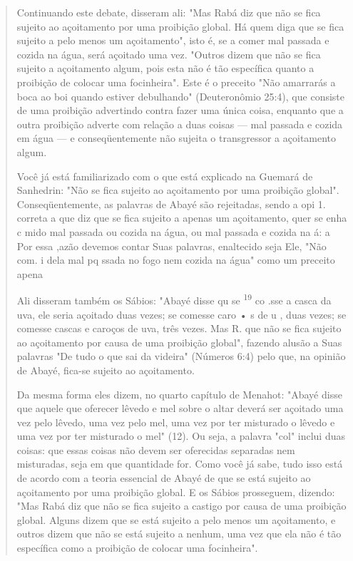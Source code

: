 \begin{quote}
Continuando este debate, disseram ali: "Mas Rabá diz que não se fi­ca
sujeito ao açoitamento por uma proibição global. Há quem diga que se
fica sujeito a pelo menos um açoitamento", isto é, se a comer mal
passada e cozida na água, será açoitado uma vez. "Outros dizem que não
se fica sujeito a açoita­mento algum, pois esta não é tão específica
quanto a proibição de colocar uma focinheira". Este é o preceito "Não
amarrarás a boca ao boi quando estiver de­bulhando" (Deuteronômio 25:4),
que consiste de uma proibição advertindo con­tra fazer uma única coisa,
enquanto que a outra proibição adverte com relação a duas coisas --- mal
passada e cozida em água --- e conseqüentemente não su­jeita o
transgressor a açoitamento algum.

Você já está familiarizado com o que está explicado na Guemará de
Sanhedrin: "Não se fica sujeito ao açoitamento por uma proibição
global". Con­seqüentemente, as palavras de Abayé são rejeitadas, sendo a
opi 1. correta a que diz que se fica sujeito a apenas um açoitamento,
quer se enha c mido mal passada ou cozida na água, ou mal passada e
cozida na á: a Por essa ,azão devemos contar Suas palavras, enaltecido
seja Ele, "Não com. i dela mal pq ssa­da no fogo nem
cozida na água" como um preceito apena

Ali disseram também os Sábios: "Abayé disse qu se \textsuperscript{19}
co .sse a casca da uva, ele seria açoitado duas vezes;
se comesse caro • s de u , duas vezes; se comesse cascas e caroços de
uva, três vezes. Mas R. que não se fica sujeito ao açoitamento por causa
de uma proibição global", fazendo alu­são a Suas palavras "De tudo o que
sai da videira" (Números 6:4) pelo que, na opinião de Abayé, fica-se
sujeito ao açoitamento.

Da mesma forma eles dizem, no quarto capítulo de Menahot: "Aba­yé disse
que aquele que oferecer lêvedo e mel sobre o altar deverá ser açoitado
uma vez pelo lêvedo, uma vez pelo mel, uma vez por ter misturado o
lêvedo e uma vez por ter misturado o mel" (12). Ou seja, a palavra "col"
inclui duas coisas: que essas coisas não devem ser oferecidas separadas
nem misturadas, seja em que quantidade for. Como você já sabe, tudo isso
está de acordo com a teoria essencial de Abayé de que se está sujeito ao
açoitamento por uma proi­bição global. E os Sábios prosseguem, dizendo:
"Mas Rabá diz que não se fica sujeito a castigo por causa de uma
proibição global. Alguns dizem que se está sujeito a pelo menos um
açoitamento, e outros dizem que não se está sujeito a nenhum, uma vez
que ela não é tão específica como a proibição de colocar uma
focinheira".


\end{quote}
